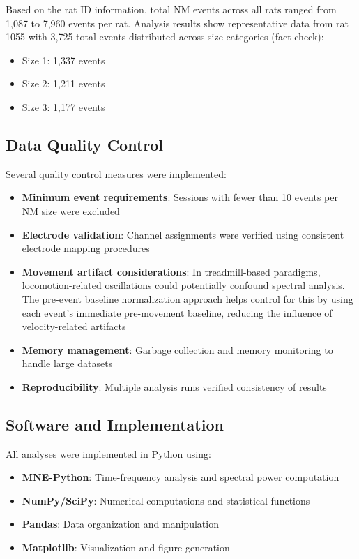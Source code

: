 \documentclass[11pt]{article}
\begin{document}
Based on the rat ID information, total NM events across all rats ranged from 1,087 to 7,960 events per rat. Analysis results show representative data from rat 1055 with 3,725 total events distributed across size categories (fact-check):
\begin{itemize}
\item Size 1: 1,337 events
\item Size 2: 1,211 events
\item Size 3: 1,177 events
\end{itemize}

\subsection{Data Quality Control}

Several quality control measures were implemented:

\begin{itemize}
\item \textbf{Minimum event requirements}: Sessions with fewer than 10 events per NM size were excluded
\item \textbf{Electrode validation}: Channel assignments were verified using consistent electrode mapping procedures
\item \textbf{Movement artifact considerations}: In treadmill-based paradigms, locomotion-related oscillations could potentially confound spectral analysis. The pre-event baseline normalization approach helps control for this by using each event's immediate pre-movement baseline, reducing the influence of velocity-related artifacts
\item \textbf{Memory management}: Garbage collection and memory monitoring to handle large datasets
\item \textbf{Reproducibility}: Multiple analysis runs verified consistency of results
\end{itemize}

\subsection{Software and Implementation}

All analyses were implemented in Python using:
\begin{itemize}
\item \textbf{MNE-Python}: Time-frequency analysis and spectral power computation
\item \textbf{NumPy/SciPy}: Numerical computations and statistical functions
\item \textbf{Pandas}: Data organization and manipulation
\item \textbf{Matplotlib}: Visualization and figure generation
\end{itemize}
\end{document}
